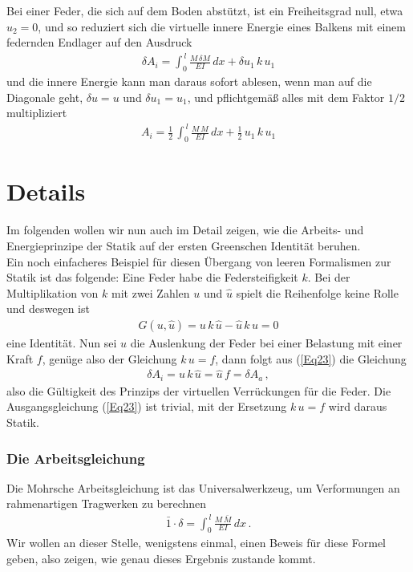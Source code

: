Bei einer Feder, die sich auf dem Boden abst\"{u}tzt, ist ein Freiheitsgrad null, etwa $u_2 = 0$, und so reduziert sich die virtuelle innere Energie eines Balkens mit einem federnden Endlager auf den Ausdruck
\begin{align}
\delta A_i = \int_0^{\,l} \frac{M\,\delta M}{EI}\,dx + \delta u_1\,k\,u_1
\end{align}
und die innere Energie kann man daraus sofort ablesen, wenn man auf die Diagonale geht, $\delta u = u$ und $\delta u_1 = u_1$, und pflichtgem\"{a}{\ss} alles mit dem Faktor $1/2$ multipliziert
\begin{align}
A_i = \frac{1}{2}\, \int_0^{\,l} \frac{M\, M}{EI}\,dx + \frac{1}{2}\, u_1\,k\,u_1
\end{align}
\section{Details}

Im folgenden wollen wir nun auch im Detail zeigen, wie die Arbeits- und Energieprinzipe der Statik auf der ersten Greenschen Identit\"{a}t beruhen.\\

Ein noch einfacheres Beispiel f\"{u}r diesen \"{U}bergang von leeren Formalismen zur Statik ist das folgende: Eine Feder habe die Federsteifigkeit $k$. Bei der Multiplikation von $k$ mit zwei Zahlen $u$ und $\hat{u}$ spielt die Reihenfolge keine Rolle und deswegen ist
\begin{align} \label{Eq23}
G(u,\hat{u}) = u\,k\,\hat{u} - \hat{u}\,k\,u = 0
\end{align}
eine Identit\"{a}t. Nun sei $u$ die Auslenkung der Feder bei einer Belastung mit einer Kraft $f$, gen\"{u}ge also der Gleichung $k\,u = f$, dann folgt aus (\ref{Eq23}) die Gleichung
\begin{align}
\delta A_i = u\,k\,\hat{u} = \hat{u}\,f = \delta A_a \,,
\end{align}
also die G\"{u}ltigkeit des Prinzips der virtuellen Verr\"{u}ckungen f\"{u}r die Feder. Die Ausgangs\-gleich\-ung (\ref{Eq23}) ist trivial, mit der Ersetzung $k\,u = f$ wird daraus Statik.\\

\subsubsection{Die Arbeitsgleichung}
Die Mohrsche Arbeitsgleichung ist das Universalwerkzeug, um Verformungen an rahmenartigen Tragwerken zu berechnen
\begin{align}
\bar{1}\cdot\delta = \int_0^{\,l} \frac{M\,\bar{M}}{EI}\,dx\,.
\end{align}
Wir wollen an dieser Stelle, wenigstens einmal, einen Beweis f\"{u}r diese Formel geben, also zeigen, wie genau dieses Ergebnis zustande kommt.

